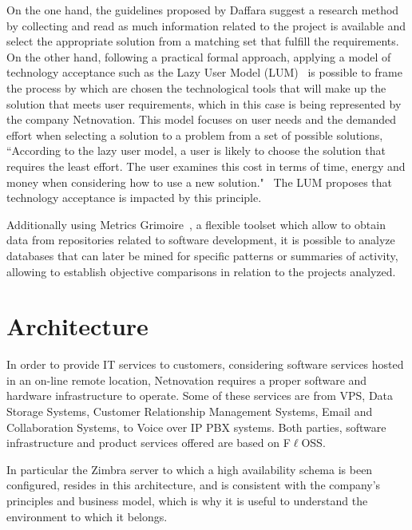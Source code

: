 \documentclass[a4paper, 12pt]{book}
\begin{document}
\noindent On the one hand, the guidelines proposed by Daffara suggest a research method by collecting and read as much information related to the project is available and select the appropriate solution from a matching set that fulfill the requirements. On the other hand, following a practical formal approach, applying a model of technology acceptance such as the Lazy User Model (LUM)~\cite{CandT1} is possible to frame the process by which are chosen the technological tools that will make up the solution that meets user requirements, which in this case is being represented by the company Netnovation. This model focuses on user needs and the demanded effort when selecting a solution to a problem from a set of possible solutions, ``According to the lazy user model, a user is likely to choose the solution that requires the least effort. The user examines this cost in terms of time, energy and money when considering how to use a new solution."~\cite{CandT2} The LUM proposes that technology acceptance is impacted 
by this principle.\bigskip

\noindent Additionally using Metrics Grimoire~\cite{GSyC}, a flexible toolset which allow to obtain data from repositories related to software development, it is possible to analyze databases that can later be mined for specific patterns or summaries of activity, allowing to establish objective comparisons in relation to the projects analyzed.


%
\chapter{Architecture}
\label{chap:architecture}

In order to provide IT services to customers, considering software services hosted in an on-line remote location, Netnovation requires a proper software and hardware infrastructure to operate. Some of these services are from VPS, Data Storage Systems, Customer Relationship Management Systems, Email and Collaboration Systems, to Voice over IP PBX systems. Both parties, software infrastructure and product services offered are based on F$\ell$OSS.\bigskip

\noindent In particular the Zimbra server to which a high availability schema is been configured, resides in this architecture, and is consistent with the company's principles and business model, which is why it is useful to understand the environment to which it belongs.
\end{document}
